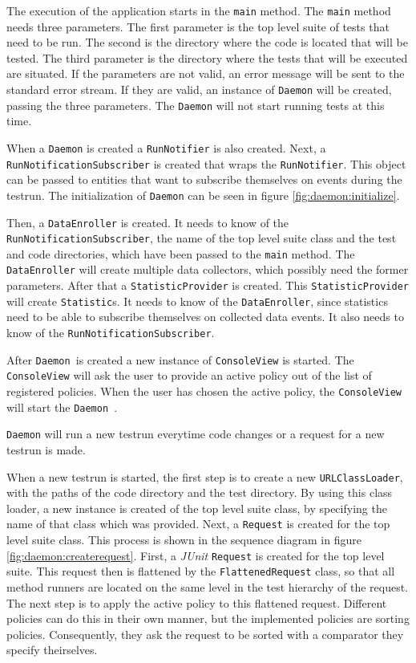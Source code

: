 \documentclass[i2]{oss}
\newcommand{\class}[1]{\texttt{#1}}
\newcommand{\method}[1]{\texttt{#1}}
\newcommand{\junit}{\emph{JUnit }}
\newcommand{\Daemon}{\class{Daemon  }}
\begin{document}
The execution of the application starts in the \method{main} method. The \method{main} method needs three parameters. The first parameter is the top level suite of tests that need to be run. The second is the directory where the code is located that will be tested. The third parameter is the directory where the tests that will be executed are situated. If the parameters are not valid, an error message will be sent to the standard error stream. If they are valid, an instance of \class{Daemon} will be created, passing the three parameters. The \class{Daemon} will not start running tests at this time.

When a \class{Daemon} is created a \class{RunNotifier} is also created. Next, a \class{RunNotificationSubscriber} is created that wraps the \class{RunNotifier}. This object can be passed to entities that want to subscribe themselves on events during the testrun. The initialization of \class{Daemon} can be seen in figure \ref{fig:daemon:initialize}.

Then, a \class{DataEnroller} is created. It needs to know of the \class{RunNotificationSubscriber}, the name of the top level suite class and the test and code directories, which have been passed to the \method{main} method. The \class{DataEnroller} will create multiple data collectors, which possibly need the former parameters. After that a \class{StatisticProvider} is created. This \class{StatisticProvider} will create \class{Statistic}s. It needs to know of the \class{DataEnroller}, since statistics need to be able to subscribe themselves on collected data events. It also needs to know of the \class{RunNotificationSubscriber}. 

After \Daemon is created a new instance of \class{ConsoleView} is started. The \class{ConsoleView} will ask the user to provide an active policy out of the list of registered policies. When the user has chosen the active policy, the \class{ConsoleView} will start the \Daemon.

\class{Daemon} will run a new testrun everytime code changes or a request for a new testrun is made.

When a new testrun is started, the first step is to create a new \class{URLClassLoader}, with the paths of the code directory and the test directory. By using this class loader, a new instance is created of the top level suite class, by specifying the name of that class which was provided.
Next, a \class{Request} is created for the top level suite class. This process is shown in the sequence diagram in figure  \ref{fig:daemon:createrequest}. First, a \junit \class{Request} is created for the top level suite. This request then is flattened by the \class{FlattenedRequest} class, so that all method runners are located on the same level in the test hierarchy of the request. The next step is to apply the active policy to this flattened request. Different policies can do this in their own manner, but the implemented policies are sorting policies. Consequently, they ask the request to be sorted with a comparator they specify theirselves.
\end{document}
